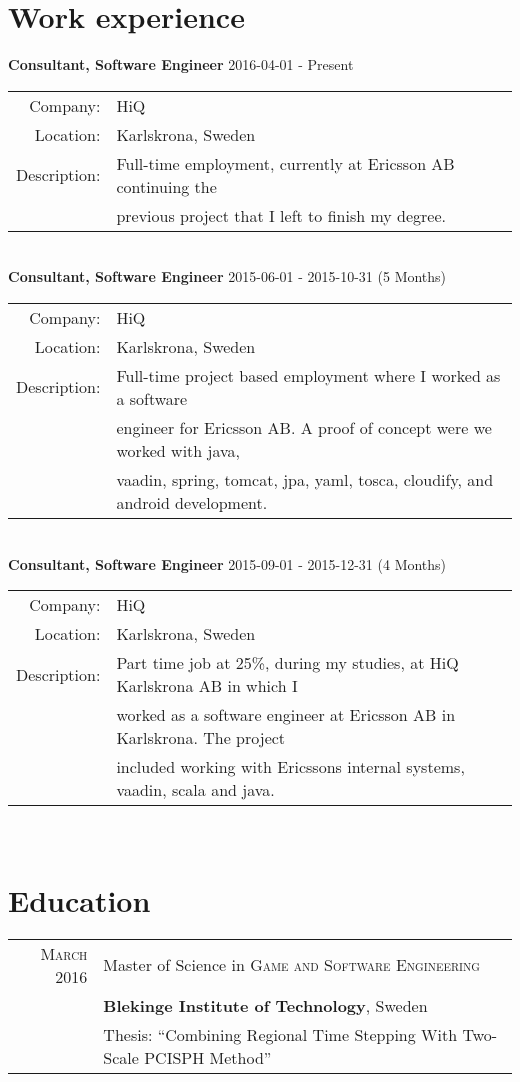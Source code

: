 \documentclass[a4paper,10pt]{article}
\begin{document}
\section{Work experience}
\textbf{Consultant, Software Engineer} 2016-04-01 - Present \\
\begin{tabular}{rl}
Company:& HiQ \\
Location:& Karlskrona, Sweden \\
Description:& Full-time employment, currently at Ericsson AB continuing the\\&
previous project that I left to finish my degree.
\end{tabular}\\

\textbf{Consultant, Software Engineer} 2015-06-01 - 2015-10-31 (5 Months)\\
\begin{tabular}{rl}
Company:& HiQ \\
Location:& Karlskrona, Sweden \\
Description:& Full-time project based employment where I worked as a software \\&
engineer for Ericsson AB. A proof of concept were we worked with java, \\&
vaadin, spring, tomcat, jpa, yaml, tosca, cloudify, and android development.\\
\end{tabular}\\

\textbf{Consultant, Software Engineer} 2015-09-01 - 2015-12-31 (4 Months) \\
\begin{tabular}{rl}
Company:& HiQ \\
Location:& Karlskrona, Sweden \\
Description:& Part time job at 25\%, during my studies, at HiQ Karlskrona AB in which I\\&
worked as a software engineer at Ericsson AB in Karlskrona. The project\\&
included working with Ericssons internal systems, vaadin, scala and java.
\end{tabular}\\


\section{Education}
\begin{tabular}{rl}	
 \textsc{March} 2016 & Master of Science in \textsc{Game and Software Engineering}\\ 
& \textbf{Blekinge Institute of Technology}, Sweden\\
& Thesis: ``Combining Regional Time Stepping With Two-Scale PCISPH Method''
\end{tabular}
\end{document}
